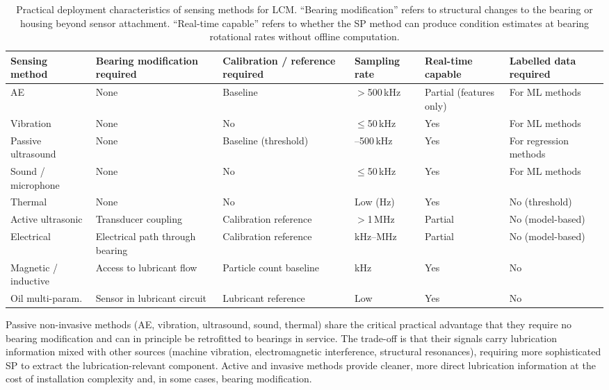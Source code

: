 \begin{table}[H]
\scriptsize
\centering
\renewcommand{\arraystretch}{1.4}
\setlength{\tabcolsep}{4pt}
\begin{tabularx}{\linewidth}{|
>{\raggedright\arraybackslash}p{2.2cm}
| >{\centering\arraybackslash}X
| >{\centering\arraybackslash}X
| >{\centering\arraybackslash}X
| >{\centering\arraybackslash}X
| >{\centering\arraybackslash}X |}
\hline
\textbf{Sensing method} & \textbf{Bearing modification required} & \textbf{Calibration / reference required} & \textbf{Sampling rate} & \textbf{Real-time capable} & \textbf{Labelled data required} \\
\hline
AE & None & Baseline \cite{cornel_condition_2021} & $>$500\,kHz & Partial (features only) & For ML methods \\
\hline
Vibration & None & No & $\leq$50\,kHz & Yes & For ML methods \\
\hline
Passive ultrasound & None & Baseline (threshold) \cite{lineham_ultrasonic_2008} & 20--500\,kHz & Yes & For regression methods \\
\hline
Sound / microphone & None & No & $\leq$50\,kHz & Yes & For ML methods \\
\hline
Thermal & None & No & Low (Hz) & Yes & No (threshold) \\
\hline
Active ultrasonic & Transducer coupling & Calibration reference \cite{hansen_comparison_2022} & $>$1\,MHz & Partial & No (model-based) \\
\hline
Electrical & Electrical path through bearing & Calibration reference \cite{cen_ehl_2021} & kHz--MHz & Partial & No (model-based) \\
\hline
Magnetic / inductive & Access to lubricant flow & Particle count baseline & kHz & Yes & No \\
\hline
Oil multi-param. & Sensor in lubricant circuit & Lubricant reference & Low & Yes & No \\
\hline
\end{tabularx}
\caption{Practical deployment characteristics of sensing methods for LCM. ``Bearing modification'' refers to structural changes to the bearing or housing beyond sensor attachment. ``Real-time capable'' refers to whether the SP method can produce condition estimates at bearing rotational rates without offline computation.}
\label{tab:deployment}
\end{table}

Passive non-invasive methods (AE, vibration, ultrasound, sound, thermal) share the critical practical advantage that they require no bearing modification and can in principle be retrofitted to bearings in service. The trade-off is that their signals carry lubrication information mixed with other sources (machine vibration, electromagnetic interference, structural resonances), requiring more sophisticated SP to extract the lubrication-relevant component. Active and invasive methods provide cleaner, more direct lubrication information at the cost of installation complexity and, in some cases, bearing modification.

